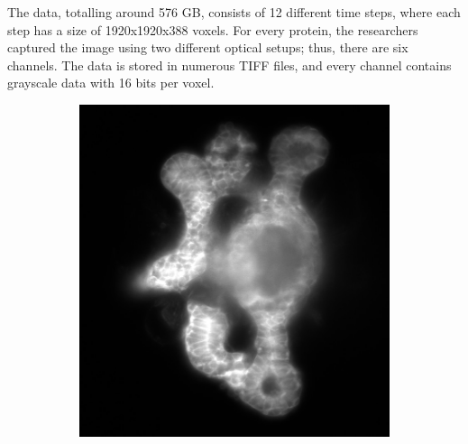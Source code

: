 \documentclass[
  digital,     %
  oneside,     %
  nosansbold,  %
  nocolorbold, %
  lof,         %
  lot,         %
]{fithesis4}
\begin{document}
The data, totalling around 576 GB, consists of 12 different time steps, where
each step has a size of 1920x1920x388 voxels. For every protein, the researchers
captured the image using two different optical setups; thus, there are six
channels. The data is stored in numerous TIFF files, and every channel contains
grayscale data with 16 bits per voxel.
\begin{figure}
    \begin{subfigure}[t]{0.4\textwidth}
        \centering
        \includegraphics[width=\textwidth]{resources/C3-t006-200-scaled.jpg}
        \caption{}
        \label{fig:data_example_membraine}
    \end{subfigure}
    \begin{subfigure}[t]{0.4\textwidth}
        \centering

\end{subfigure}
\end{figure}
\end{document}
